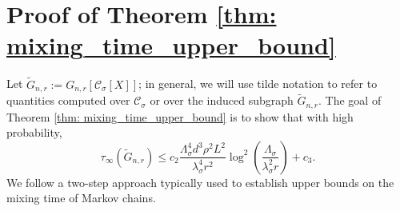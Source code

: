 \documentclass[11pt,twoside]{article}
\newcommand{\vol}{\mathrm{vol}}
\newcommand{\cut}{\mathrm{cut}}
\newcommand{\1}{\mathbf{1}}
\newcommand{\Err}{\mathrm{Err}}
\newcommand{\Xbf}{X}             %
\newcommand{\Pbb}{\mathbb{P}}
\newcommand{\Cset}{\mathcal{C}}
\newcommand{\Csig}{\Cset_{\sigma}}
\begin{document}

\section{Proof of Theorem \ref{thm: mixing_time_upper_bound}}

Let $\widetilde{G}_{n,r} := G_{n,r}[\Csig[\Xbf]]$; in general, we will use tilde notation to refer to quantities computed over $\Csig$ or over the induced subgraph $\widetilde{G}_{n,r}$. The goal of Theorem \ref{thm: mixing_time_upper_bound} is to show that with high probability,
\begin{equation*}
\tau_{\infty}(\widetilde{G}_{n,r}) \leq c_2 \frac{\Lambda_{\sigma}^4 d^3 \rho^2 L^2}{\lambda_{\sigma}^4 r^2} \log^2\left(\frac{ \Lambda_{\sigma}}{\lambda_{\sigma}^2 r}\right) + c_3.
\end{equation*}
We follow a two-step approach typically used to establish upper bounds on the mixing time of Markov chains. 
\end{document}

